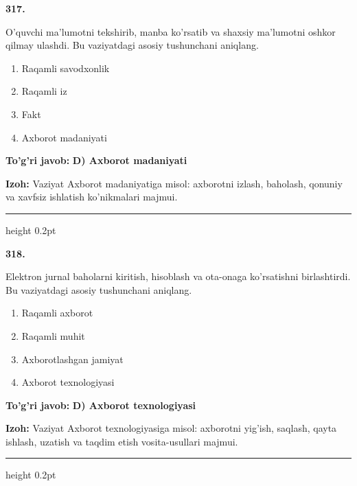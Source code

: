 \documentclass[10pt,a4paper,oneside]{article}
\begin{document}
\noindent\textbf{\color{ink}317.}
\par
O'quvchi ma'lumotni tekshirib, manba ko'rsatib va shaxsiy ma'lumotni oshkor qilmay ulashdi. Bu vaziyatdagi asosiy tushunchani aniqlang.
\begin{enumerate}[label=\Alph*),leftmargin=9mm]
\item Raqamli savodxonlik
\item Raqamli iz
\item Fakt
\item Axborot madaniyati
\end{enumerate}
\begin{tcolorbox}[enhanced,breakable,colback=teal!4,colframe=teal!50!black,boxrule=0.5pt,arc=1.1mm,left=3mm,right=3mm,top=1.7mm,bottom=1.7mm,before skip=2mm,after skip=2mm]
\textbf{\color{teal}To'g'ri javob:} \textbf{D) Axborot madaniyati}
\par\smallskip
\textbf{Izoh:} Vaziyat Axborot madaniyatiga misol: axborotni izlash, baholash, qonuniy va xavfsiz ishlatish ko'nikmalari majmui.
\end{tcolorbox}
\vspace{2mm}\hrule height 0.2pt \vspace{3mm}

\noindent\textbf{\color{ink}318.}
\par
Elektron jurnal baholarni kiritish, hisoblash va ota-onaga ko'rsatishni birlashtirdi. Bu vaziyatdagi asosiy tushunchani aniqlang.
\begin{enumerate}[label=\Alph*),leftmargin=9mm]
\item Raqamli axborot
\item Raqamli muhit
\item Axborotlashgan jamiyat
\item Axborot texnologiyasi
\end{enumerate}
\begin{tcolorbox}[enhanced,breakable,colback=teal!4,colframe=teal!50!black,boxrule=0.5pt,arc=1.1mm,left=3mm,right=3mm,top=1.7mm,bottom=1.7mm,before skip=2mm,after skip=2mm]
\textbf{\color{teal}To'g'ri javob:} \textbf{D) Axborot texnologiyasi}
\par\smallskip
\textbf{Izoh:} Vaziyat Axborot texnologiyasiga misol: axborotni yig'ish, saqlash, qayta ishlash, uzatish va taqdim etish vosita-usullari majmui.
\end{tcolorbox}
\vspace{2mm}\hrule height 0.2pt \vspace{3mm}
\end{document}
